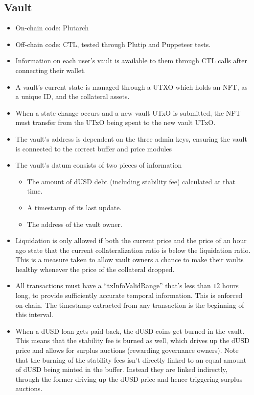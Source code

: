 \documentclass{article} %
\begin{document}
\subsection{Vault}

\begin{itemize}
  \item On-chain code: Plutarch
  \item Off-chain code: CTL, tested through Plutip and Puppeteer tests.
  \item Information on each user's vault is available to them through CTL
    calls after connecting their wallet.
  \item A vault's current state is managed through a UTXO which holds an NFT, 
    as a unique ID, and the collateral assets.
  \item When a state change occurs and a new vault UTxO is submitted, the NFT must
    transfer from the UTxO being spent to the new vault UTxO.
  \item The vault's address is dependent on the three admin keys, ensuring the
    vault is connected to the correct buffer and price modules
  \item The vault's datum consists of two pieces of information
    \begin{itemize}
      \item The amount of dUSD debt (including stability fee) calculated at that
       time.
      \item A timestamp of its last update.
      \item The address of the vault owner.
    \end{itemize}
  \item Liquidation is only allowed if both the current price and the price of
    an hour ago state that the current collateralization ratio is below the
    liquidation ratio.
    This is a measure taken to allow vault owners a chance to make their vaults
    healthy whenever the price of the collateral dropped.
  \item All transactions must have a ``txInfoValidRange'' that's less than $12$
    hours long, to provide sufficiently accurate temporal information. This is
    enforced on-chain. The timestamp extracted from any transaction is the
    beginning of this interval.
  \item When a dUSD loan gets paid back, the dUSD coins get burned in the vault.
    This means that the stability fee is burned as well, which drives up the
    dUSD price and allows for surplus auctions (rewarding governance owners).
    Note that the burning of the stability fees isn't directly linked to an
    equal amount of dUSD being minted in the buffer.
    Instead they are linked indirectly, through the former driving up the dUSD
    price and hence triggering surplus auctions.
\end{itemize}
\end{document}
